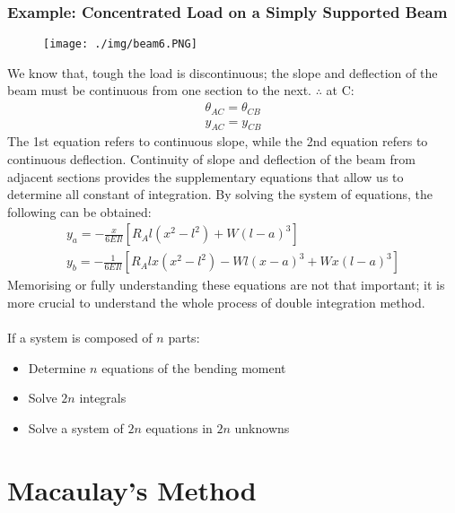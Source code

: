 \subsubsection{Example: Concentrated Load on a Simply Supported Beam}
\begin{figure}[H]
  \centering
  \texttt{[image: ./img/beam6.PNG]}
\end{figure}
We know that, tough the load is discontinuous; the slope and deflection of the beam must be continuous from one section to the next. $\therefore$ at C:
\begin{gather}
  \theta_{AC} = \theta_{CB} \\
  y_{AC} = y_{CB}
\end{gather}
The 1st equation refers to continuous slope, while the 2nd equation refers to continuous deflection. Continuity of slope and deflection of the beam from adjacent sections provides the supplementary equations that allow us to determine all constant of integration. By solving the system of equations, the following can be obtained:
\begin{gather}
  y_a = -\frac{x}{6EIl}[R_Al(x^2-l^2)+W(l-a)^3] \\
  y_b = -\frac{1}{6EIl}[R_Alx(x^2-l^2)-Wl(x-a)^3+Wx(l-a)^3]
\end{gather}
Memorising or fully understanding these equations are not that important; it is more crucial to understand the whole process of double integration method. \\\\
If a system is composed of $n$ parts:
\begin{itemize}[noitemsep]
  \item Determine $n$ equations of the bending moment
  \item Solve $2n$ integrals
  \item Solve a system of $2n$ equations in $2n$ unknowns
\end{itemize}
\section{Macaulay’s Method}
